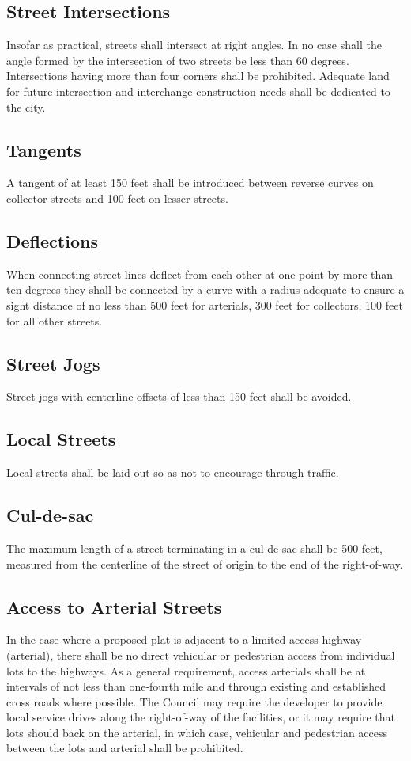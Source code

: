 \subsection{Street Intersections}
Insofar as practical, streets shall intersect at right angles.  In no case shall the angle formed by the intersection of two streets be less than 60 degrees. Intersections having more than four corners shall be prohibited. Adequate land for future intersection and interchange construction needs shall be dedicated to the city.
\subsection{Tangents}
A tangent of at least 150 feet shall be introduced between reverse curves on collector streets and 100 feet on lesser streets.
\subsection{Deflections}
When connecting street lines deflect from each other at one point by more than ten degrees they shall be connected by a curve with a radius adequate to ensure a sight distance of no less than 500 feet for arterials, 300 feet for collectors, 100 feet for all other streets.
\subsection{Street Jogs}
Street jogs with centerline offsets of less than 150 feet shall be avoided.
\subsection{Local Streets}
Local streets shall be laid out so as not to encourage through traffic.
\subsection{Cul-de-sac}
The maximum length of a street terminating in a cul-de-sac shall be 500 feet, measured from the centerline of the street of origin to the end of the right-of-way.
\subsection{Access to Arterial Streets}
In the case where a proposed plat is adjacent to a limited access highway (arterial), there shall be no direct vehicular or pedestrian access from individual lots to the highways. As a general requirement, access arterials shall be at intervals of not less than one-fourth mile and through existing and established cross roads where possible. The Council may require the developer to provide local service drives along the right-of-way of the facilities, or it may require that lots should back on the arterial, in which case, vehicular and pedestrian access between the lots and arterial shall be prohibited.
